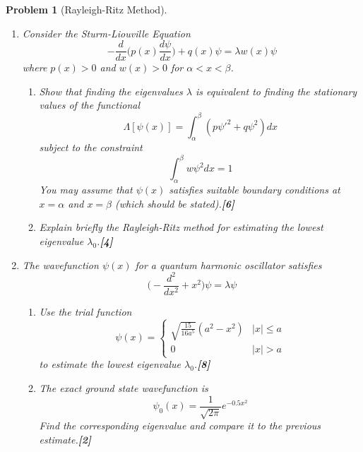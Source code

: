 \documentclass[a4paper]{article}
\theoremstyle{new}
\newtheorem{qns}{Problem}[section]
\begin{document}
\begin{qns}[Rayleigh-Ritz Method]\leavevmode
\begin{enumerate}[label=(\roman*)]
\item Consider the Sturm-Liouville Equation
$$-\frac{d}{dx}\bigg(p(x)\frac{d\psi}{dx}\bigg)+q(x)\psi=\lambda w(x)\psi$$
where $p(x)>0$ and $w(x)>0$ for $\alpha<x<\beta$.
\begin{enumerate}[label=(\alph*)]
\item Show that finding the eigenvalues $\lambda$ is equivalent to finding the stationary values of the functional
$$\Lambda[\psi(x)]=\int_\alpha^\beta(p\psi'^2+q\psi^2)dx$$
subject to the constraint
$$\int_\alpha^\beta w\psi^2dx=1$$
You may assume that $\psi(x)$ satisfies suitable boundary conditions at $x=\alpha$ and $x=\beta$ (which should be stated).\hfill \textbf{[6]}
\item Explain briefly the Rayleigh-Ritz method for estimating the lowest eigenvalue $\lambda_0$.\hfill \textbf{[4]}
\end{enumerate}

\item The wavefunction $\psi(x)$ for a quantum harmonic oscillator satisfies
$$\bigg(-\frac{d^2}{dx^2}+x^2\bigg)\psi=\lambda\psi$$
\begin{enumerate}[label=(\alph*)]
\item Use the trial function
$$\psi(x)=
\left\{
        \begin{array}{ll}
      \sqrt{\frac{15}{16a^5}}(a^2-x^2) & |x|\leq a\\
      0 & |x|>a
        \end{array}
    \right.$$
to estimate the lowest eigenvalue $\lambda_0$.\hfill \textbf{[8]}
\item The exact ground state wavefunction is 
$$\psi_0(x)=\frac{1}{\sqrt{2\pi}}e^{-0.5x^2}$$
Find the corresponding eigenvalue and compare it to the previous estimate.\hfill \textbf{[2]}
\end{enumerate}
\end{enumerate}
\end{qns}
\newpage
\end{document}
